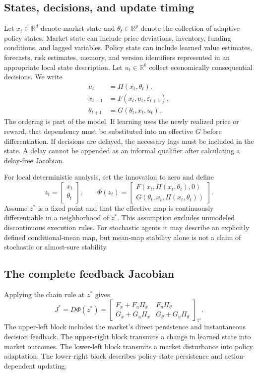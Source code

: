 \documentclass[11pt,a4paper]{article}
\theoremstyle{definition}
\theoremstyle{remark}
\newcommand{\R}{\mathbb{R}}
\begin{document}
\subsection{States, decisions, and update timing}
Let $x_t\in\R^d$ denote market state and $\theta_t\in\R^p$ denote the collection of adaptive policy states. Market state can include price deviations, inventory, funding conditions, and lagged variables. Policy state can include learned value estimates, forecasts, risk estimates, memory, and version identifiers represented in an appropriate local state description. Let $u_t\in\R^k$ collect economically consequential decisions. We write
\begin{align}
 u_t &= \Pi(x_t,\theta_t), \label{eq:policy}\\
 x_{t+1} &= F(x_t,u_t,\varepsilon_{t+1}), \label{eq:market}\\
 \theta_{t+1} &= G(\theta_t,x_t,u_t). \label{eq:learning}
\end{align}
The ordering is part of the model. If learning uses the newly realized price or reward, that dependency must be substituted into an effective $G$ before differentiation. If decisions are delayed, the necessary lags must be included in the state. A delay cannot be appended as an informal qualifier after calculating a delay-free Jacobian.

For local deterministic analysis, set the innovation to zero and define
\begin{equation}
 z_t=\begin{bmatrix}x_t\\\theta_t\end{bmatrix},\qquad
 \Phi(z_t)=\begin{bmatrix}
 F(x_t,\Pi(x_t,\theta_t),0)\\
 G(\theta_t,x_t,\Pi(x_t,\theta_t))
 \end{bmatrix}.
 \label{eq:joint}
\end{equation}
Assume $z^*$ is a fixed point and that the effective map is continuously differentiable in a neighborhood of $z^*$. This assumption excludes unmodeled discontinuous execution rules. For stochastic agents it may describe an explicitly defined conditional-mean map, but mean-map stability alone is not a claim of stochastic or almost-sure stability.

\subsection{The complete feedback Jacobian}
Applying the chain rule at $z^*$ gives
\begin{equation}
 J^*=D\Phi(z^*)=
 \begin{bmatrix}
 F_x+F_u\Pi_x & F_u\Pi_\theta\\
 G_x+G_u\Pi_x & G_\theta+G_u\Pi_\theta
 \end{bmatrix}_{z^*}.
 \label{eq:fulljac}
\end{equation}
The upper-left block includes the market's direct persistence and instantaneous decision feedback. The upper-right block transmits a change in learned state into market outcomes. The lower-left block transmits a market disturbance into policy adaptation. The lower-right block describes policy-state persistence and action-dependent updating.
\end{document}
